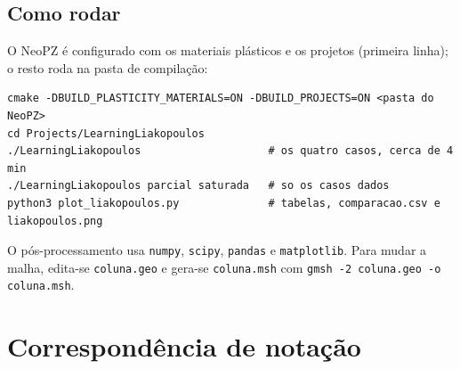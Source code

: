 \documentclass[11pt,a4paper]{article}
\begin{document}
\subsection{Como rodar}
O NeoPZ é configurado com os materiais plásticos e os projetos (primeira linha); o resto roda
na pasta de compilação:

\begin{lstlisting}[style=neopzsh]
cmake -DBUILD_PLASTICITY_MATERIALS=ON -DBUILD_PROJECTS=ON <pasta do NeoPZ>
cd Projects/LearningLiakopoulos
./LearningLiakopoulos                    # os quatro casos, cerca de 4 min
./LearningLiakopoulos parcial saturada   # so os casos dados
python3 plot_liakopoulos.py              # tabelas, comparacao.csv e liakopoulos.png
\end{lstlisting}
O pós-processamento usa \texttt{numpy}, \texttt{scipy}, \texttt{pandas} e \texttt{matplotlib}.
Para mudar a malha, edita-se \texttt{coluna.geo} e gera-se \texttt{coluna.msh} com
\texttt{gmsh -2 coluna.geo -o coluna.msh}.

\appendix
\section{Correspondência de notação}
\label{ap:notacao}
\end{document}
